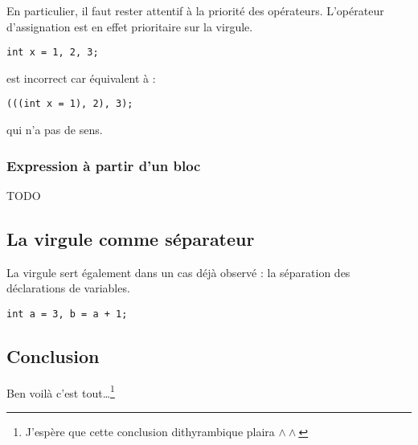 \documentclass[../../../main.tex]{subfiles}
\begin{document}
En particulier, il faut rester attentif à la priorité des opérateurs. L’opérateur d’assignation est en effet
prioritaire sur la virgule.
\begin{verbatim}
int x = 1, 2, 3;
\end{verbatim}
est incorrect car équivalent à :
\begin{verbatim}
(((int x = 1), 2), 3);
\end{verbatim}
qui n’a pas de sens.
\subsubsection{Expression à partir d'un bloc}
TODO
\subsection{La virgule comme séparateur}
\label{sub:la_virgule_comme_s_parateur}
La virgule sert également dans un cas déjà observé : la séparation des déclarations de variables.
\begin{verbatim}
int a = 3, b = a + 1;
\end{verbatim}
\subsection{Conclusion}
\label{sub:conclusion}
Ben voilà c’est tout\dots\footnote{J'espère que cette conclusion dithyrambique plaira $\wedge\wedge$}
\end{document}
